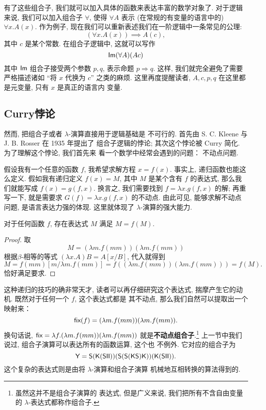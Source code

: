 有了这些组合子, 我们就可以加入具体的函数来表达丰富的数学对象了.
对于逻辑来说, 我们可以加入组合子 \(\forall\), 使得
\(\forall A\) 表示 (在常规的有变量的语言中的) \(\forall x. A(x)\).
作为例子, 现在我们可以重新表述我们在一阶逻辑中一条常见的公理:
\[(\forall x. A(x)) \implies A(c),\]
其中 \(c\) 是某个常数. 在组合子逻辑中, 这就可以写作
\[\textsf{Im}(\forall A)(A c)\]
其中 \(\textsf{Im}\) 组合子接受两个参数 \(p, q\), 表示命题
\(p \Rightarrow q\). 这样, 我们就完全避免了需要严格描述诸如
“将 \(x\) 代换为 \(c\)” 之类的麻烦. 这里再度提醒读者,
\(A, c, p, q\) 在这里都是元变量, 只有 \(x\) 是真正的语言内
变量.

\subsection{Curry悖论}
然而, 把组合子或者 \(\lambda\)-演算直接用于逻辑基础是
不可行的. 首先由 S. C. Kleene 与 J. B. Rosser 在 1935 年提出了
组合子逻辑的悖论; 其次这个悖论被 Curry 简化. 为了理解这个悖论, 我们首先来
看一个数学中经常会遇到的问题： 不动点问题.

假设我有一个任意的函数 \(f\), 我希望求解方程 \(x = f(x)\).
事实上, 递归函数也能这么定义. 假如我有递归定义 \(f(x) = M\),
其中 \(M\) 是某个含有 \(f\) 的表达式, 那么我们就能写成
\(f(x) = g(f,x)\). 换言之, 我们需要找到 \(f = \lambda x. g(f,x)\)
的解; 再重写一下, 就是需要求 \(G(f) = \lambda x. g(f,x)\)
的不动点. 由此可见, 能够求解不动点问题, 是语言表达力强的体现.
这里就体现了 \(\lambda\)-演算的强大能力.

\begin{theorem}
对于任何函数 \(f\), 存在表达式 \(M\) 满足 \(M=f(M)\).
\end{theorem}
\begin{proof}
取
\[M = (\lambda m. f(mm))(\lambda m. f(mm))\]
根据\(\beta\)-相等的等式 \((\lambda x. A)B = A[x/B]\),
代入就得到
\[M = f(mm)[m/\lambda m.f(mm)]
= f((\lambda m. f(mm))(\lambda m.f(mm)))
= f(M).\]
恰好满足要求.
\end{proof}
这种递归的技巧的确非常天才, 读者可以再仔细研究这个表达式,
揣摩产生它的动机. 既然对于任何一个 \(f\), 这个表达式都是
其不动点, 那么我们自然可以提取出一个映射来：
\[\textsf{fix}(f) = (\lambda m. f(mm)) (\lambda m. f(mm)).\]
换句话说, \(\textsf{fix} = \lambda f. (\lambda m. f(mm)) (\lambda m. f(mm))\)
就是\textbf{不动点组合子}.\footnote{虽然这并不是组合子演算的
表达式, 但是广义来说, 我们把所有不含自由变量
的 \(\lambda\)-表达式都称作组合子.}
上一节中我们说过, 组合子演算可以表达所有的函数运算, 这个也
不例外. 它对应的组合子为
\[\textsf{Y} = \textsf{S}(\textsf{K}(\textsf{S}\textsf{I}\textsf{I}))
(\textsf{S}(\textsf{S}(\textsf{K}\textsf{S})\textsf{K}))
(\textsf{K}(\textsf{S}\textsf{I}\textsf{I})).\]
这个复杂的表达式则是由将 \(\lambda\)-演算和组合子演算
机械地互相转换的算法得到的.

